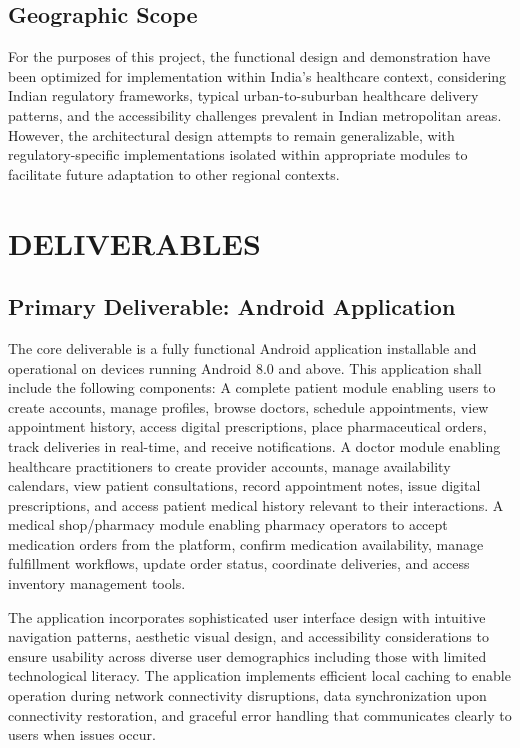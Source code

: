 \documentclass[12pt,a4paper]{report}
\begin{document}
\subsection{Geographic Scope}

For the purposes of this project, the functional design and demonstration have been optimized for implementation within India's healthcare context, considering Indian regulatory frameworks, typical urban-to-suburban healthcare delivery patterns, and the accessibility challenges prevalent in Indian metropolitan areas. However, the architectural design attempts to remain generalizable, with regulatory-specific implementations isolated within appropriate modules to facilitate future adaptation to other regional contexts.

\section{DELIVERABLES}

\subsection{Primary Deliverable: Android Application}

The core deliverable is a fully functional Android application installable and operational on devices running Android 8.0 and above. This application shall include the following components: A complete patient module enabling users to create accounts, manage profiles, browse doctors, schedule appointments, view appointment history, access digital prescriptions, place pharmaceutical orders, track deliveries in real-time, and receive notifications. A doctor module enabling healthcare practitioners to create provider accounts, manage availability calendars, view patient consultations, record appointment notes, issue digital prescriptions, and access patient medical history relevant to their interactions. A medical shop/pharmacy module enabling pharmacy operators to accept medication orders from the platform, confirm medication availability, manage fulfillment workflows, update order status, coordinate deliveries, and access inventory management tools.

The application incorporates sophisticated user interface design with intuitive navigation patterns, aesthetic visual design, and accessibility considerations to ensure usability across diverse user demographics including those with limited technological literacy. The application implements efficient local caching to enable operation during network connectivity disruptions, data synchronization upon connectivity restoration, and graceful error handling that communicates clearly to users when issues occur.
\end{document}
